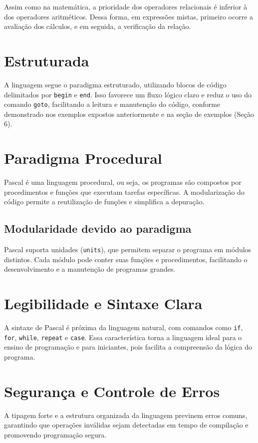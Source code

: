 \documentclass[12pt,a4paper,oneside]{abntex2}
\begin{document}
Assim como na matemática, a prioridade dos operadores relacionais é inferior à dos operadores aritméticos. Dessa forma, em expressões mistas, primeiro ocorre a avaliação dos cálculos, e em seguida, a verificação da relação.

\section{Estruturada}
A linguagem segue o paradigma estruturado, utilizando blocos de código delimitados por \texttt{begin} e \texttt{end}. Isso favorece um fluxo lógico claro e reduz o uso do comando \texttt{goto}, facilitando a leitura e manutenção do código, conforme demonstrado nos exemplos expostos anteriormente e na seção de exemplos (Seção 6).

\section{Paradigma Procedural}
Pascal é uma linguagem procedural, ou seja, os programas são compostos por procedimentos e funções que executam tarefas específicas. A modularização do código permite a reutilização de funções e simplifica a depuração.

\subsection{Modularidade devido ao paradigma}
Pascal suporta unidades (\texttt{units}), que permitem separar o programa em módulos distintos. Cada módulo pode conter suas funções e procedimentos, facilitando o desenvolvimento e a manutenção de programas grandes.

\section{Legibilidade e Sintaxe Clara}
A sintaxe de Pascal é próxima da linguagem natural, com comandos como \texttt{if}, \texttt{for}, \texttt{while}, \texttt{repeat} e \texttt{case}. Essa característica torna a linguagem ideal para o ensino de programação e para iniciantes, pois facilita a compreensão da lógica do programa.

\section{Segurança e Controle de Erros}
A tipagem forte e a estrutura organizada da linguagem previnem erros comuns, garantindo que operações inválidas sejam detectadas em tempo de compilação e promovendo programação segura.
\end{document}
